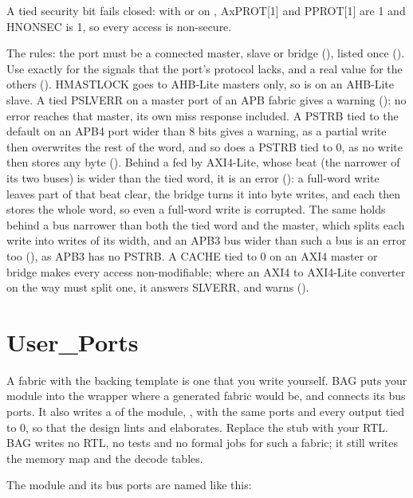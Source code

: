 A tied security bit fails closed: with  or  on
, AxPROT[1] and PPROT[1] are 1 and HNONSEC is 1, so every access is
non-secure.

The rules: the port must be a connected master, slave or bridge
(), listed once (). Use
 exactly for the signals that the port's protocol lacks, and a real value for
the others (). HMASTLOCK goes to AHB-Lite masters only, so
 is  on an AHB-Lite slave. A tied PSLVERR on a master port
of an APB fabric gives a warning (): no error reaches that
master, its own miss response included. A PSTRB tied to the default on an APB4 port wider
than 8 bits gives a warning, as a partial write then overwrites the rest of the word, and
so does a PSTRB tied to 0, as no write then stores any byte ().
Behind a  fed by AXI4-Lite, whose beat (the narrower of its two buses)
is wider than the tied word, it is an error (): a full-word
write leaves part of that beat clear, the bridge turns it into byte writes, and each then
stores the whole word, so even a full-word write is corrupted. The same holds behind a bus
narrower than both the tied word and the master, which splits each write into writes of
its width, and an APB3 bus wider than such a bus is an error too
(), as APB3 has no PSTRB.
A CACHE tied to 0 on an AXI4 master or bridge makes every access non-modifiable; where an
AXI4 to AXI4-Lite converter on the way must split one, it answers SLVERR, and
 warns ().

\section{User\_Ports}
\label{sec:wb-user-ports}

A fabric with the backing template  is one that you write yourself.
BAG puts your module into the wrapper where a generated fabric would be, and connects
its bus ports. It also writes a  of the module, ,
with the same ports and every output tied to 0, so that the design lints and elaborates.
Replace the stub with your RTL. BAG writes no RTL, no tests and no formal jobs for such
a fabric; it still writes the memory map and the decode tables.

The module and its bus ports are named like this:

